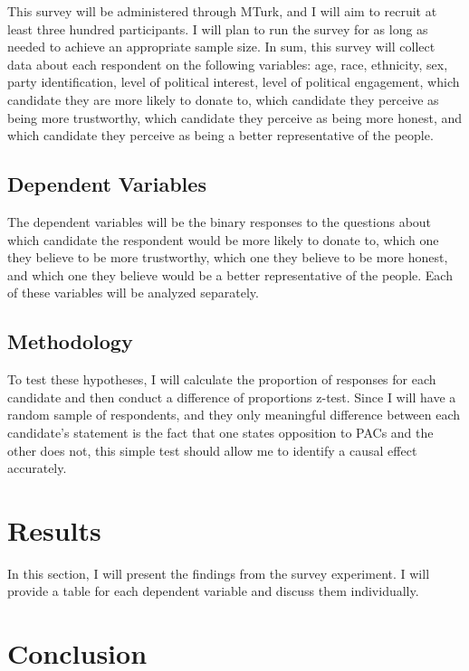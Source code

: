 \documentclass[12pt]{article}
\begin{document}
This survey will be administered through MTurk, and I will aim to recruit at least three hundred participants. I will plan to run the survey for as long as needed to achieve an appropriate sample size. In sum, this survey will collect data about each respondent on the following variables: age, race, ethnicity, sex, party identification, level of political interest, level of political engagement, which candidate they are more likely to donate to, which candidate they perceive as being more trustworthy, which candidate they perceive as being more honest, and which candidate they perceive as being a better representative of the people.

\subsection{Dependent Variables}

The dependent variables will be the binary responses to the questions about which candidate the respondent would be more likely to donate to, which one they believe to be more trustworthy, which one they believe to be more honest, and which one they believe would be a better representative of the people. Each of these variables will be analyzed separately.  

\subsection{Methodology}

To test these hypotheses, I will calculate the proportion of responses for each candidate and then conduct a difference of proportions z-test. Since I will have a random sample of respondents, and they only meaningful difference between each candidate's statement is the fact that one states opposition to PACs and the other does not, this simple test should allow me to identify a causal effect accurately. 


\section{Results}

In this section, I will present the findings from the survey experiment. I will provide a table for each dependent variable and discuss them individually.


\section{Conclusion}
\end{document}
